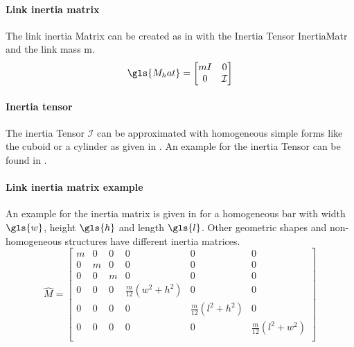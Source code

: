 \paragraph{Link inertia matrix}
The link inertia Matrix can be created as in  with the Inertia Tensor \gls{InertiaMatr} and the link mass \gls{m}.
\begin{equation}\label{eq:LinkInMatrix}
	\gls{M_hat}= 
	\begin{bmatrix}
	mI & 0\\
	0  & \mathcal{I}
	\end{bmatrix}
\end{equation}

\paragraph{Inertia tensor}
The inertia Tensor
 $\mathcal{I}$ 
can be approximated with homogeneous simple forms like the cuboid or a cylinder as given in \cite{PhysScientEng}. 
An example for the inertia Tensor can be found in \cite{MathIntroRobManip}. 

\paragraph{Link inertia matrix example}
An example for the inertia matrix is given in  for a homogeneous bar with width $\gls{w}$, height $\gls{h}$ and length $\gls{l}$. Other geometric shapes and non-homogeneous structures have different inertia matrices. 
\begin{equation} \label{eq:InMatrHomBar}
	\hat{M}=
	\begin{bmatrix}
	m & 0 & 0 & 0 & 0 & 0\\
	0 & m & 0 & 0 & 0 & 0\\
	0 & 0 & m & 0 & 0 & 0\\
	0 & 0 & 0 & \frac{m}{12}(w^2 + h^2) & 0 & 0\\
	0 & 0 & 0 & 0 & \frac{m}{12}(l^2+h^2) & 0\\
	0 & 0 & 0 & 0 & 0 & \frac{m}{12}(l^2 +w^2)\\
	\end{bmatrix}
\end{equation}


%
%	


